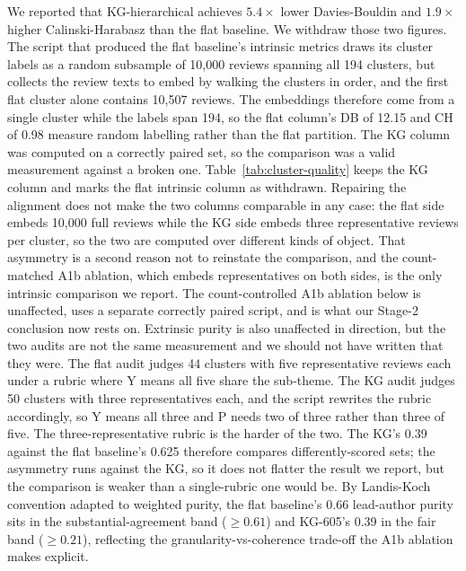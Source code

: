 \documentclass[preprint,12pt]{elsarticle}
\begin{document}
We reported that KG-hierarchical achieves $5.4\times$ lower Davies-Bouldin and $1.9\times$
  higher Calinski-Harabasz than the flat baseline. We withdraw those two figures. The script that
  produced the flat baseline's intrinsic metrics draws its cluster labels as a random subsample of
  10{,}000 reviews spanning all 194 clusters, but collects the review texts to embed by walking
  the clusters in order, and the first flat cluster alone contains 10{,}507 reviews. The
  embeddings therefore come from a single cluster while the labels span 194, so the flat column's
  DB of 12.15 and CH of 0.98 measure random labelling rather than the flat partition. The KG
  column was computed on a correctly paired set, so the comparison was a valid measurement against
  a broken one. Table~\ref{tab:cluster-quality} keeps the KG column and marks the flat intrinsic
  column as withdrawn. Repairing the alignment does not make the two columns comparable in any
  case: the flat side embeds 10{,}000 full reviews while the KG side embeds three representative
  reviews per cluster, so the two are computed over different kinds of object. That asymmetry is
  a second reason not to reinstate the comparison, and the count-matched A1b ablation, which
  embeds representatives on both sides, is the only intrinsic comparison we report. The count-controlled A1b ablation below is unaffected, uses a separate
  correctly paired script, and is what our Stage-2 conclusion now rests on. Extrinsic purity is
  also unaffected in direction, but the two audits are not the same measurement and we should not
  have written that they were. The flat audit judges 44 clusters with five representative reviews
  each under a rubric where Y means all five share the sub-theme. The KG audit judges 50 clusters
  with three representatives each, and the script rewrites the rubric accordingly, so Y means all
  three and P needs two of three rather than three of five. The three-representative rubric is the
  harder of the two. The KG's 0.39 against the flat baseline's 0.625 therefore compares
  differently-scored sets; the asymmetry runs against the KG, so it does not flatter the result we
  report, but the comparison is weaker than a single-rubric one would be. By Landis-Koch~\cite{landis1977measurement} convention adapted to weighted purity, the flat baseline's
  0.66 lead-author purity sits in the substantial-agreement band ($\geq 0.61$) and KG-605's 0.39
   in the fair band ($\geq 0.21$), reflecting the granularity-vs-coherence trade-off the A1b
  ablation makes explicit.
\end{document}

